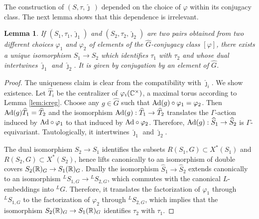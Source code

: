 \documentclass{article}
\newtheorem{lem}[thm]{Lemma}
\theoremstyle{definition}
\newtheorem{cns}[thm]{Construction}
\numberwithin{equation}{section}
\renewcommand{\-}{\hyp{}}
\newcommand{\warn}[1]{{\leavevmode\color{red}[#1]}}
\begin{document}
The construction of $(S,\tau,\hat\jmath\,)$ depended on the choice of $\varphi$ within its conjugacy class. The next lemma shows that this dependence is irrelevant.

\begin{lem} \label{lem:a}
If $(S_1,\tau_1,\hat\jmath_1)$ and $(S_2,\tau_2,\hat\jmath_2)$ are two pairs obtained from two different choices $\varphi_1$ and $\varphi_2$ of elements of the $\hat G$-conjugacy class $[\varphi]$, there exists a unique isomorphism $S_1 \to S_2$ which identifies $\tau_1$ with $\tau_2$ and whose dual intertwines $\hat\jmath_1$ and $\hat\jmath_2$. It is given by conjugation by an element of $\hat G$.
\end{lem}
\begin{proof}
	The uniqueness claim is clear from the compatibility with $\hat\jmath_i$. We show existence. Let $\hat T_i$ be the centralizer of $\varphi_i(\mathbb{C}^\times)$, a maximal torus according to Lemma \ref{lem:icreg}. Choose any $g \in \hat G$ such that $\textrm{Ad}(g) \circ\varphi_1=\varphi_2$. Then $\textrm{Ad}(g)\widehat T_1=\widehat T_2$ and the isomorphism $\textrm{Ad}(g) : \widehat T_1 \to \widehat T_2$ translates the $\Gamma$-action induced by $\textrm{Ad}\circ\varphi_1$ to that induced by $\textrm{Ad}\circ\varphi_2$. Therefore, $\textrm{Ad}(g) : \widehat S_1 \to \widehat S_2$ is $\Gamma$-equivariant. Tautologically, it intertwines $\hat\jmath_1$ and $\hat\jmath_2$.

	The dual isomorphism $S_2 \to S_1$ identifies the subsets $R(S_1,G) \subset X^*(S_1)$ and $R(S_2,G) \subset X^*(S_2)$, hence lifts canonically to an isomorphism of double covers $S_2(\mathbb{R})_G \to S_1(\mathbb{R})_G$. Dually the isomorphism $\hat S_1 \to \hat S_2$ extends canonically to an isomorphism $^LS_{1,G} \to {^LS_{2,G}}$, which commutes with the canonical $L$\-embeddings into $^LG$. Therefore, it translates the factorization of $\varphi_1$ through $^LS_{1,G}$ to the factorization of $\varphi_2$ through $^LS_{2,G}$, which implies that the isomorphism $S_2(\mathbb{R})_G \to S_1(\mathbb{R})_G$ identifies $\tau_2$ with $\tau_1$.
\end{proof}

	
\end{document}
